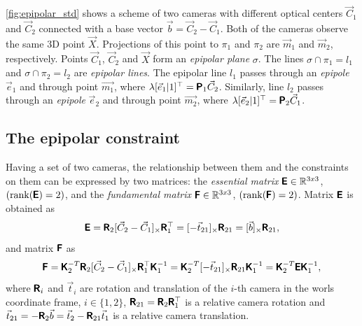 \autoref{fig:epipolar_std} shows a scheme of two cameras with different optical centers $\vec{C}_1$ and $\vec{C}_2$ connected with a base vector $\vec{b} = \vec{C}_2 - \vec{C}_1$. 
Both of the cameras observe the same 3D point $\vec{X}$. 
Projections of this point to $\pi_1$ and $\pi_2$ are $\vec{m}_1$ and $\vec{m}_2$, respectively. 
Points $\vec{C}_1$, $\vec{C}_2$ and $\vec{X}$ form an \textit{epipolar plane} $\sigma$.
The lines $\sigma \cap \pi_1 = l_1$ and $\sigma \cap \pi_2 = l_2$ are \textit{epipolar lines}. 
The epipolar line $l_1$ passes through an \textit{epipole} $\vec{e}_1$ and through point $\vec{m_1}$, where $\lambda [\vec{e}_1 | 1]^\top = \pmb{\mathsf{P}}_1 \vec{C}_2$.
Similarly, line $l_2$ passes through an \textit{epipole} $\vec{e}_2$ and through point $\vec{m_2}$, where $\lambda [\vec{e}_2 | 1]^\top = \pmb{\mathsf{P}}_2 \vec{C}_1$.

\subsection{The epipolar constraint}
Having a set of two cameras, the relationship between them and the constraints on them can be expressed by two matrices: the \textit{essential matrix} $\pmb{\mathsf{E}} \in \mathbb{R}^{3x3}$, $(\operatorname{rank}(\pmb{\mathsf{E}}) = 2)$, and the \textit{fundamental matrix} $\pmb{\mathsf{F}} \in \mathbb{R}^{3x3}$, $(\operatorname{rank}(\pmb{\mathsf{F}}) = 2)$. Matrix $\pmb{\mathsf{E}}$ is obtained as
\begin{equation}
    \label{eq:E}
    \pmb{\mathsf{E}} = \pmb{\mathsf{R}}_2 [\vec{C}_2 - \vec{C}_1]_{\times} \pmb{\mathsf{R}}_1^\top = [-\vec{t}_{21}]_{\times} \pmb{\mathsf{R}}_{21} = [\vec{b}]_{\times} \pmb{\mathsf{R}}_{21},
\end{equation}
and matrix $\pmb{\mathsf{F}}$ as
\begin{equation}
    \label{eq:F}
    \pmb{\mathsf{F}} = \pmb{\mathsf{K}}_2^{-T} \pmb{\mathsf{R}}_2 [\vec{C}_2 - \vec{C}_1]_{\times} \pmb{\mathsf{R}}_1^\top \pmb{\mathsf{K}}_1^{-1} = 
    \pmb{\mathsf{K}}_2^{-T} [-\vec{t}_{21}]_{\times} \pmb{\mathsf{R}}_{21} \pmb{\mathsf{K}}_1^{-1} = 
    \pmb{\mathsf{K}}_2^{-T} \pmb{\mathsf{E}} \pmb{\mathsf{K}}_1^{-1},
\end{equation}
where 
$\pmb{\mathsf{R}}_i$ and $\vec{t}_i$ are rotation and translation of the $i$-th camera in the worls coordinate frame, $i \in \{1, 2\}$,
$\pmb{\mathsf{R}}_{21} = \pmb{\mathsf{R}}_2 \pmb{\mathsf{R}}_1^\top$ is a relative camera rotation and 
$\vec{t}_{21} = -\pmb{\mathsf{R}}_2 \vec{b} = \vec{t}_2 - \pmb{\mathsf{R}}_{21}\vec{t}_1$ is a relative camera translation.

